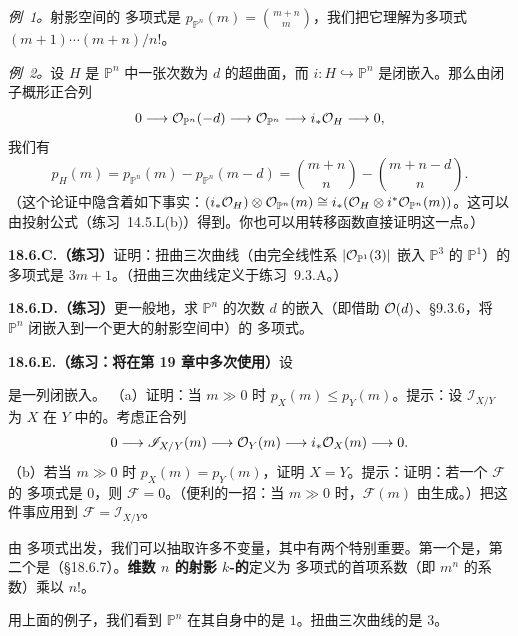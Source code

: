 \emph{例~1。}\quad 射影空间的 \trHilbert{}多项式是 $p_{\mathbb{P}^n}(m)=\binom{m+n}{m}$，我们把它理解为多项式 $(m+1)\cdots(m+n)/n!$。

\emph{例~2。}\quad 设 $H$ 是 $\mathbb{P}^n$ 中一张次数为 $d$ 的超曲面，而 $i\colon H\hookrightarrow\mathbb{P}^n$ 是闭嵌入。那么由闭子概形正合列
\[
0\longrightarrow\mathcal{O}_{\mathbb{P}^n}(-d)\longrightarrow\mathcal{O}_{\mathbb{P}^n}\longrightarrow i_*\mathcal{O}_H\longrightarrow 0,
\]
我们有
\begin{equation*}\tag{18.6.3.2}\label{eq:hilbert-polynomial-hypersurface}
p_H(m)=p_{\mathbb{P}^n}(m)-p_{\mathbb{P}^n}(m-d)=\binom{m+n}{n}-\binom{m+n-d}{n}.
\end{equation*}
（这个论证中隐含着如下事实：$(i_*\mathcal{O}_H)\otimes\mathcal{O}_{\mathbb{P}^n}(m)\cong i_*(\mathcal{O}_H\otimes i^*\mathcal{O}_{\mathbb{P}^n}(m))$。这可以由投射公式（\mbox{练习~14.5.L(b)}）得到。你也可以用转移函数直接证明这一点。）

\textbf{18.6.C.（练习）}\quad 证明：扭曲三次曲线（由完全线性系 $|\mathcal{O}_{\mathbb{P}^1}(3)|$ 嵌入 $\mathbb{P}^3$ 的 $\mathbb{P}^1$）的 \trHilbert{}多项式是 $3m+1$。（扭曲三次曲线定义于\mbox{练习~9.3.A}。）

\textbf{18.6.D.（练习）}\quad 更一般地，求 $\mathbb{P}^n$ 的次数 $d$ 的\trVeronese{}嵌入（即借助\trLineBundle{} $\mathcal{O}(d)$、\S9.3.6，将 $\mathbb{P}^n$ 闭嵌入到一个更大的射影空间中）的 \trHilbert{}多项式。

\textbf{18.6.E.（练习：将在第 19 章中多次使用）}\quad 设
是一列闭嵌入。
（a）证明：当 $m\gg 0$ 时 $p_X(m)\le p_Y(m)$。提示：设 $\mathscr{I}_{X/Y}$ 为 $X$ 在 $Y$ 中的\trIdealSheaf。考虑正合列
\[
0\longrightarrow\mathscr{I}_{X/Y}(m)\longrightarrow\mathcal{O}_Y(m)\longrightarrow i_*\mathcal{O}_X(m)\longrightarrow 0.
\]
（b）若当 $m\gg 0$ 时 $p_X(m)=p_Y(m)$，证明 $X=Y$。提示：证明：若一个\trCoherentSheaf{} $\mathscr{F}$ 的 \trHilbert{}多项式是 $0$，则 $\mathscr{F}=0$。（便利的一招：当 $m\gg 0$ 时，$\mathscr{F}(m)$ 由\trGlobalSections{}生成。）把这件事应用到 $\mathscr{F}=\mathscr{I}_{X/Y}$。

由 \trHilbert{}多项式出发，我们可以抽取许多不变量，其中有两个特别重要。第一个是\emph{\trDegree}，第二个是\trArithmeticGenus（\S18.6.7）。\textbf{维数 $n$ 的射影 $k$-\trScheme{}的\trDegree}定义为 \trHilbert{}多项式的首项系数（即 $m^n$ 的系数）乘以 $n!$。

用上面的例子，我们看到 $\mathbb{P}^n$ 在其自身中的\trDegree{}是 $1$。扭曲三次曲线的\trDegree{}是 $3$。


